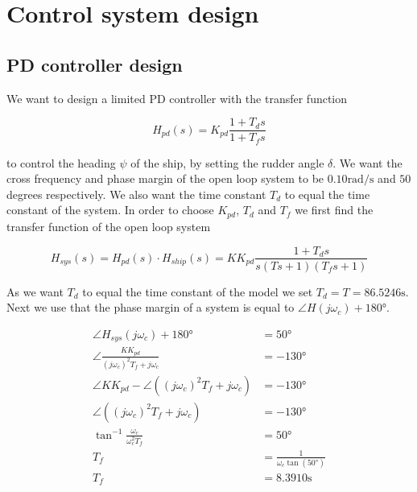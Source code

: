 
\section{Control system design}

\subsection{PD controller design}

We want to design a limited PD controller with the transfer function

\begin{equation}
    H_{pd}(s) = K_{pd}\frac{1+T_ds}{1+T_fs} \label{eq:H_pd}
\end{equation}

to control the heading $\psi$ of the ship, by setting the rudder angle $\delta$. We want the cross frequency and phase margin of the open loop system to be $0.10\si{\radian\per\second}$ and $50$ degrees respectively. We also want the time constant $T_d$ to equal the time constant of the system. In order to choose $K_{pd}$, $T_d$ and $T_f$ we first find the transfer function of the open loop system

\begin{equation}
    H_{sys}(s) = H_{pd}(s) \cdot H_{ship}(s) = KK_{pd}\frac{1+T_ds}{s(Ts+1)(T_fs+1)} \label{eq:H_sys}
\end{equation}

As we want $T_d$ to equal the time constant of the model we set $T_d = T = 86.5246 \si{\second}$. Next we use that the phase margin of a system is equal to $\angle H(j\omega_c) + 180 \si{\degree}$.

\begin{subequations}
    \begin{align}
        \angle H_{sys}(j\omega_c) + 180 \si{\degree} &= 50 \si{\degree} \\
        \angle \frac{KK_{pd}}{(j\omega_c)^2T_f+j\omega_c} &= -130 \si{\degree}\\
        \angle KK_{pd} - \angle ((j\omega_c)^2T_f+j\omega_c) &= -130 \si{\degree} \\
        \angle ((j\omega_c)^2T_f+j\omega_c) &= -130\si{\degree} \\
        \tan^{-1}\frac{\omega_c}{\omega_c^2T_f} &= 50 \si{\degree} \\
        T_f &= \frac{1}{ \omega_c \tan (50 \si{\degree}) } \\
        T_f &= 8.3910 \si{\second} \label{eq:T_f}
    \end{align}
\end{subequations}

